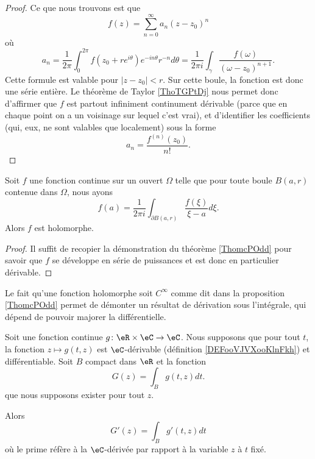 \begin{proof}
    Ce que nous trouvons est que
    \begin{equation}
        f(z)=\sum_{n=0}^{\infty}a_n(z-z_0)^n
    \end{equation}
    où
    \begin{equation}
        a_n=\frac{1}{ 2\pi }\int_0^{2\pi}f(z_0+r e^{i\theta}) e^{-in\theta}r^{-n}d\theta=\frac{1}{ 2\pi i }\int_{\gamma}\frac{ f(\omega) }{ (\omega-z_0)^{n+1} }.
    \end{equation}
    Cette formule est valable pour \( | z-z_0 |<r\). Sur cette boule, la fonction est donc une série entière. Le théorème de Taylor \ref{ThoTGPtDj} nous permet donc d'affirmer que \( f\) est partout infiniment continument dérivable (parce que en chaque point on a un voisinage sur lequel c'est vrai), et d'identifier les coefficients (qui, eux, ne sont valables que localement) sous la forme
    \begin{equation}
        a_n=\frac{ f^{(n)}(z_0) }{ n! }.
    \end{equation}
\end{proof}

\begin{corollary}       \label{CorwfHtJu}
    Soit \( f\) une fonction continue sur un ouvert \( \Omega\) telle que pour toute boule \( B(a,r)\) contenue dans \( \Omega\), nous ayons
    \begin{equation}
        f(a)=\frac{1}{ 2\pi i }\int_{\partial B(a,r)}\frac{ f(\xi) }{ \xi-a }d\xi.
    \end{equation}
    Alors \( f\) est holomorphe.
\end{corollary}

\begin{proof}
    Il suffit de recopier la démonstration du théorème \ref{ThomcPOdd} pour savoir que \( f\) se développe en série de puissances et est donc en particulier dérivable.
\end{proof}

Le fait qu'une fonction holomorphe soit \(  C^{\infty}\) comme dit dans la proposition \ref{ThomcPOdd} permet de démonter un résultat de dérivation sous l'intégrale, qui dépend de pouvoir majorer la différentielle.

\begin{proposition}     \label{PROPooZCLYooUaSMWA}
    Soit une fonction continue \( g\colon \eR\times \eC\to \eC\). Nous supposons que pour tout \( t\), la fonction \( z\mapsto g(t,z)\) est \( \eC\)-dérivable (définition \ref{DEFooVJVXooKlnFkh}) et différentiable. Soit \( B\) compact dans \( \eR\) et la fonction
    \begin{equation}
        G(z)=\int_B g(t,z)dt.
    \end{equation}
    que nous supposons exister pour tout \( z\).

    Alors 
    \begin{equation}
        G'(z)=\int_Bg'(t,z)dt
    \end{equation}
    où le prime réfère à la \( \eC\)-dérivée par rapport à la variable \( z\) à \( t\) fixé.
\end{proposition}

